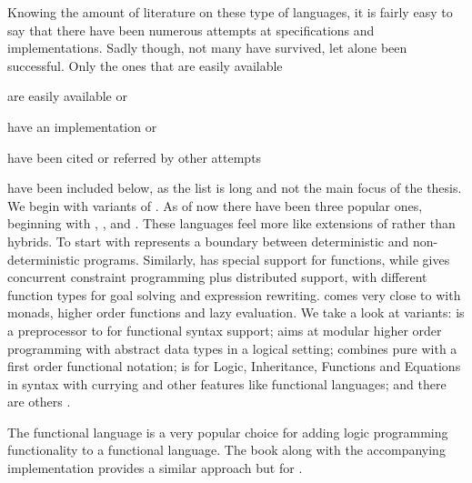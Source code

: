 \documentclass[thesis-solanki.tex]{subfiles}
\begin{document}
Knowing the amount of literature  on these type of languages, it is fairly easy to say that there have been numerous 
attempts at specifications and implementations.
Sadly though, not many have survived, let alone been successful.
Only the ones that are easily available
\begin{inparaenum}[(a)]
\item
  are easily available or
\item
  have an implementation or
\item
  have been cited or referred by other attempts
\end{inparaenum}
have been included below, as the list is long and not the main focus of the thesis.
We begin with variants of .
As of now there have been three popular ones, beginning with , \cite{website:nue-prolog},
 \cite{website:oz-mozart} and  \cite{website:mercury}.
These languages feel more like extensions of  rather than hybrids.
To start with  represents a boundary between deterministic and non-deterministic programs.
Similarly,  has special support for functions, while  gives concurrent constraint
programming plus distributed support, with different function types for goal solving and expression rewriting.
 \cite{lloyd1999programming:escher} comes very close to  with monads, higher
order functions and lazy evaluation.
We take a look at  variants:   is a preprocessor to
 for functional syntax support; 
 aims at modular higher order programming with abstract data types in a
logical setting;   combines pure
 with a first order functional notation;   is for
Logic, Inheritance, Functions and Equations in  syntax with currying and other features like
functional languages; and there are others .

The functional language  is a very popular choice for adding logic programming functionality to a functional 
language.
The book \cite{friedman05reasoned} along with the accompanying implementation \cite{website:kanren,website:minkanren} provides a similar 
approach\yyy{}{\Large,} but for  \cite{website:haskellkanren,website:molog,website:minikanrent}.
\end{document}
